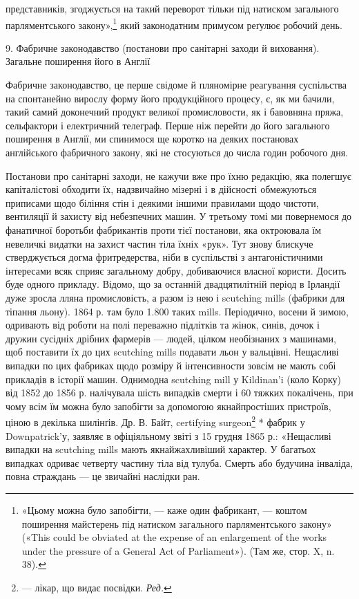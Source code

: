 представників, згоджується на такий переворот тільки під натиском загального парляментського
закону»,\footnote{
«Цьому можна було запобігти, — каже один фабрикант, — коштом
поширення майстерень під натиском загального парляментського закону»
(«This could be obviated at the expense of an enlargement of the works
under the pressure of a General Act of Parliament»). (Там же, стор. X,
n. 38).
} який законодатним
примусом реґулює робочий день.

9. Фабричне законодавство (постанови про санітарні заходи й виховання). Загальне поширення його в
Англії

Фабричне законодавство, це перше свідоме й пляномірне реагування суспільства на спонтанейно вирослу
форму його продукційного процесу, є, як ми бачили, такий самий доконечний продукт великої
промисловости, як і бавовняна пряжа, сельфактори
і електричний телеграф. Перше ніж перейти до його загального
поширення в Англії, ми спинимося ще коротко на деяких постановах англійського фабричного закону, які
не стосуються до
числа годин робочого дня.

Постанови про санітарні заходи, не кажучи вже про їхню
редакцію, яка полегшує капіталістові обходити їх, надзвичайно
мізерні і в дійсності обмежуються приписами щодо біління стін
і деякими іншими правилами щодо чистоти, вентиляції й захисту
від небезпечних машин. У третьому томі ми повернемося до фанатичної боротьби фабрикантів проти тієї
постанови, яка октроювала їм невеличкі видатки на захист частин тіла їхніх «рук».
Тут знову блискуче стверджується догма фритредерства, ніби в
суспільстві з антагоністичними інтересами всяк сприяє загальному добру, добиваючися власної користи.
Досить буде одного
прикладу. Відомо, що за останній двадцятилітній період в Ірландії дуже зросла лляна промисловість, а
разом із нею і scutching
mills (фабрики для тіпання льону). 1864 р. там було 1.800 таких
mills. Періодично, восени й зимою, одривають від роботи на
полі переважно підлітків та жінок, синів, дочок і дружин сусідніх дрібних фармерів — людей, цілком
необізнаних з машинами,
щоб поставити їх до цих scutching mills подавати льон у вальцівні.
Нещасливі випадки по цих фабриках щодо розміру й інтенсивности зовсім не мають собі прикладів в
історії машин. Однимодна
scutching mill у Kildinan’i (коло Корку) від 1852 до 1856 р.
налічувала шість випадків смерти і 60 тяжких покалічень, при
чому всім їм можна було запобігти за допомогою якнайпростіших пристроїв, ціною в декілька шилінґів.
Др. В. Байт, certifying
surgeon\footnote*{
— лікар, що видає посвідки. \emph{Ред.}
} * фабрик у Downpatrick’у, заявляє в офіціяльному
звіті з 15 грудня 1865 р.: «Нещасливі випадки на scutching
mills мають якнайжахливіший характер. У багатьох випадках одриває четверту частину тіла від тулуба.
Смерть або будучина інваліда, повна страждань — це звичайні наслідки ран.